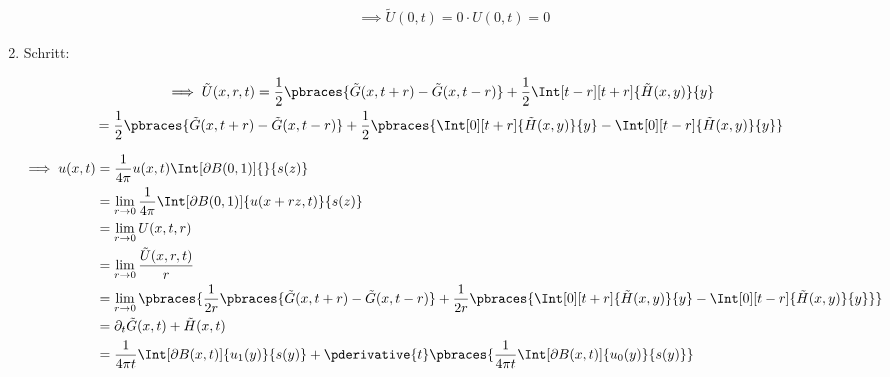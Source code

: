 \begin{solution}
\begin{enumerate}[label = \arabic*.]
\begin{enumerate}[label = 2.\arabic*.]
        \begin{align*}
            \implies
            \tilde U(0, t)
            =
            0 \cdot U(0, t)
            =
            0
        \end{align*}

    \end{enumerate}
    
    \item Schritt:
    

    \begin{multline*}
        \implies
        \tilde U(x, r, t)
        =
        \frac{1}{2}
        \pbraces
        {
            \tilde G(x, t + r)
            -
            \tilde G(x, t - r)
        }
        +
        \frac{1}{2}
        \Int[t-r][t+r]{\tilde H(x, y)}{y} \\
        =
        \frac{1}{2}
        \pbraces
        {
            \tilde G(x, t + r)
            -
            \tilde G(x, t - r)
        }
        +
        \frac{1}{2}
        \pbraces
        {
            \Int[0][t+r]{\tilde H(x, y)}{y}
            -
            \Int[0][t-r]{\tilde H(x, y)}{y}
        }
    \end{multline*}

    \begin{align*}
        \implies
        u(x, t)
        & =
        \frac{1}{4 \pi}
        u(x, t)
        \Int[\partial B(0, 1)]{}{s(z)} \\
        & =
        \lim_{r \to 0}
        \frac{1}{4 \pi}
        \Int[\partial B(0, 1)]{u(x + r z, t)}{s(z)} \\
        & =
        \lim_{r \to 0}
        U(x, t, r) \\
        & =
        \lim_{r \to 0}
        \frac{\tilde U(x, r, t)}{r} \\
        & =
        \lim_{r \to 0}
        \pbraces
        {
            \frac{1}{2 r}
            \pbraces
            {
                \tilde G(x, t + r)
                -
                \tilde G(x, t - r)
            }
            +
            \frac{1}{2 r}
            \pbraces
            {
                \Int[0][t+r]{\tilde H(x, y)}{y}
                -
                \Int[0][t-r]{\tilde H(x, y)}{y}
            }
        } \\
        & =
        \partial_t \tilde G(x, t) + \tilde H(x, t) \\
        & =
        \frac{1}{4 \pi t}
        \Int[\partial B(x, t)]{u_1(y)}{s(y)}
        +
        \pderivative{t}
        \pbraces
        {
            \frac{1}{4 \pi t}
            \Int[\partial B(x, t)]{u_0(y)}{s(y)}
        }
    \end{align*}

\end{enumerate}

\end{solution}

